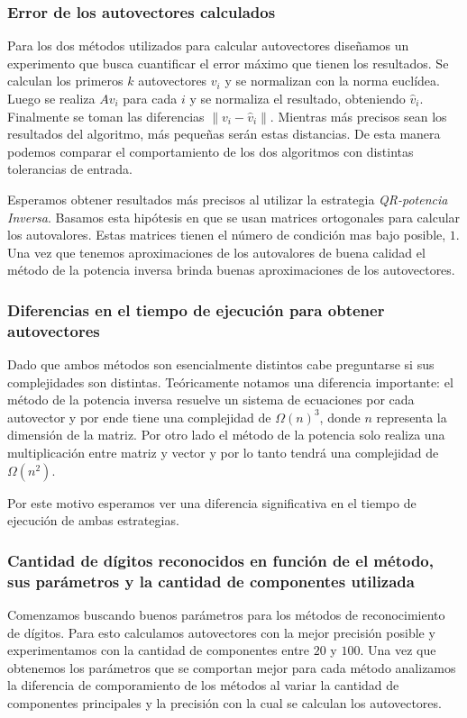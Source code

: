 	\subsubsection{Error de los autovectores calculados}
		Para los dos m\'etodos utilizados para calcular autovectores
		dise\~namos un experimento que busca cuantificar el error m\'aximo
		que tienen los resultados.
		Se calculan los primeros $k$ autovectores $v_i$ y se normalizan con la
		norma eucl\'idea. Luego se realiza $Av_i$ para cada $i$ y se normaliza
		el resultado, obteniendo $\hat{v}_i$. Finalmente se toman las diferencias
		$\|v_i-\hat{v}_i\|$. Mientras m\'as precisos sean los resultados del
		algoritmo, m\'as peque\~nas ser\'an estas distancias.
		De esta manera podemos comparar el comportamiento de los dos algoritmos
		con distintas tolerancias de entrada.
		
		Esperamos obtener resultados m\'as precisos al utilizar la estrategia
		\textit{QR-potencia Inversa}. Basamos esta hip\'otesis en que se usan
		matrices ortogonales para calcular los autovalores. Estas matrices
		tienen el n\'umero de condici\'on mas bajo posible, $1$.
		Una vez que tenemos aproximaciones de los autovalores de buena calidad
		el m\'etodo de la potencia inversa brinda buenas aproximaciones de los
		autovectores.

	\subsubsection{Diferencias en el tiempo de ejecuci\'on para obtener autovectores}
		Dado que ambos m\'etodos son esencialmente distintos cabe preguntarse
		si sus complejidades son distintas. Te\'oricamente notamos una diferencia
		importante: el m\'etodo de la potencia inversa resuelve un sistema de
		ecuaciones por cada autovector y por ende tiene una complejidad de $\Omega(n)^3$,
		donde $n$ representa la dimensi\'on de la matriz. Por otro lado el m\'etodo
		de la potencia solo realiza una multiplicaci\'on entre matriz y vector
		y por lo tanto tendr\'a una complejidad de $\Omega(n^2)$.

		Por este motivo esperamos ver una diferencia significativa en el tiempo de
		ejecuci\'on de ambas estrategias.

	\subsubsection{Cantidad de d\'igitos reconocidos en funci\'on de el m\'etodo, sus par\'ametros
	y la cantidad de componentes utilizada}
		Comenzamos buscando buenos par\'ametros para los m\'etodos de reconocimiento
		de d\'igitos. Para esto calculamos autovectores con la mejor precisi\'on
		posible y experimentamos con la cantidad de componentes entre $20$ y $100$.
		Una vez que obtenemos los par\'ametros que se comportan mejor para cada
		m\'etodo analizamos la diferencia de comporamiento de los m\'etodos
		al variar la cantidad de componentes principales y la precisi\'on con
		la cual se calculan los autovectores.

